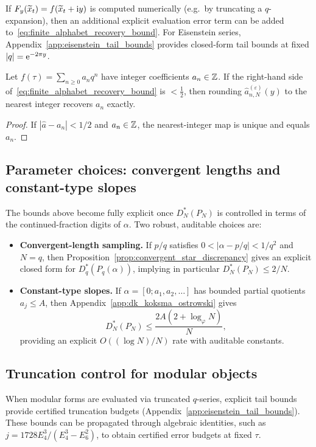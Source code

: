 \begin{remark}
\label{rem:finite_alphabet_plus_eval}
If $F_y(\widetilde x_t)=f(\widetilde x_t+\mathrm{i} y)$ is computed numerically (e.g.\ by truncating a $q$-expansion), then an additional explicit evaluation error term can be added to~\eqref{eq:finite_alphabet_recovery_bound}.
For Eisenstein series, Appendix~\ref{app:eisenstein_tail_bounds} provides closed-form tail bounds at fixed $|q|=\mathrm{e}^{-2\pi y}$.
\end{remark}

\begin{corollary}
\label{cor:exact_integer_recovery_rounding}
Let $f(\tau)=\sum_{n\ge 0} a_n q^n$ have integer coefficients $a_n\in\mathbb{Z}$. If the right-hand side of~\eqref{eq:finite_alphabet_recovery_bound} is $<\tfrac12$, then rounding $\widehat a_{n,N}^{(\varepsilon)}(y)$ to the nearest integer recovers $a_n$ exactly.
\end{corollary}
\begin{proof}
If $|\widehat a-a_n|<1/2$ and $a_n\in\mathbb{Z}$, the nearest-integer map is unique and equals $a_n$.
\end{proof}

\subsection{Parameter choices: convergent lengths and constant-type slopes}
The bounds above become fully explicit once $D_N^\ast(P_N)$ is controlled in terms of the continued-fraction digits of $\alpha$.
Two robust, auditable choices are:
\begin{itemize}
\item \textbf{Convergent-length sampling.} If $p/q$ satisfies $0<|\alpha-p/q|<1/q^2$ and $N=q$, then Proposition~\ref{prop:convergent_star_discrepancy} gives an explicit closed form for $D_q^\ast(P_q(\alpha))$, implying in particular $D_N^\ast(P_N)\le 2/N$.
\item \textbf{Constant-type slopes.} If $\alpha=[0;a_1,a_2,\ldots]$ has bounded partial quotients $a_j\le A$, then Appendix~\ref{app:dk_koksma_ostrowski} gives
\[
D_N^\ast(P_N)\le \frac{2A(2+\log_\varphi N)}{N},
\]
providing an explicit $O((\log N)/N)$ rate with auditable constants.
\end{itemize}

\subsection{Truncation control for modular objects}
When modular forms are evaluated via truncated $q$-series, explicit tail bounds provide certified truncation budgets (Appendix~\ref{app:eisenstein_tail_bounds}). These bounds can be propagated through algebraic identities, such as $j=1728E_4^3/(E_4^3-E_6^2)$, to obtain certified error budgets at fixed $\tau$.


